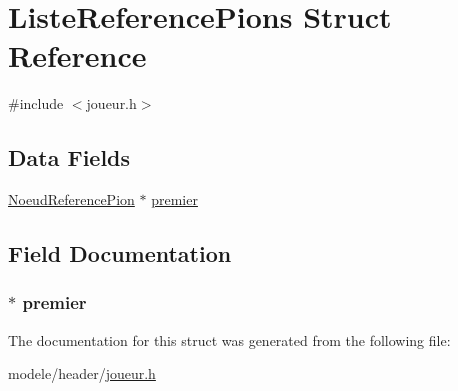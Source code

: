 \hypertarget{struct_liste_reference_pions}{\section{Liste\-Reference\-Pions Struct Reference}
\label{struct_liste_reference_pions}
}


{\ttfamily \#include $<$joueur.\-h$>$}

\subsection*{Data Fields}
\begin{DoxyCompactItemize}
\item 
\hyperlink{struct_noeud_reference_pion}{Noeud\-Reference\-Pion} $\ast$ \hyperlink{struct_liste_reference_pions_aba22eade673802a5ad7c0f5290d72ea2}{premier}
\end{DoxyCompactItemize}


\subsection{Field Documentation}
\hypertarget{struct_liste_reference_pions_aba22eade673802a5ad7c0f5290d72ea2}{
\subsubsection[{premier}]{$\ast$ premier}}\label{struct_liste_reference_pions_aba22eade673802a5ad7c0f5290d72ea2}


The documentation for this struct was generated from the following file\-:\begin{DoxyCompactItemize}
\item 
modele/header/\hyperlink{joueur_8h}{joueur.\-h}\end{DoxyCompactItemize}
